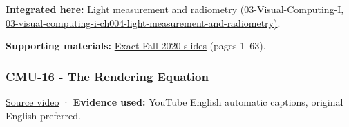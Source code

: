 \textbf{Integrated here:} \href{../03-Visual-Computing-I/main.pdf\#nameddest=03-visual-computing-i-ch004-light-measurement-and-radiometry}{Light measurement and radiometry (03-Visual-Computing-I, 03-visual-computing-i-ch004-light-measurement-and-radiometry)}.

\textbf{Supporting materials:} \href{https://15462.courses.cs.cmu.edu/fall2020content/lectures/15_radiometry/15_radiometry_slides.pdf}{Exact Fall 2020 slides} (pages 1--63).

\subsubsection{CMU-16 - The Rendering Equation}\label{04-visual-computing-ii-ch036-cmu-16---the-rendering-equation}

\href{https://www.youtube.com/watch?v=Ttxdbn7TSLI}{Source video} · \textbf{Evidence used:} YouTube English automatic captions, original English preferred.

